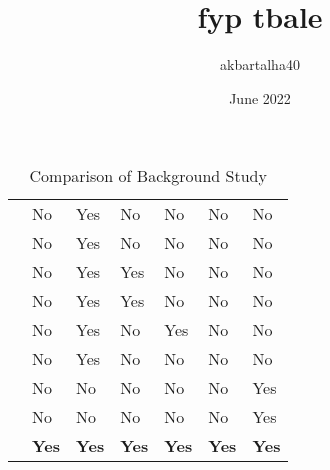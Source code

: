 \documentclass{article}
\title{fyp tbale}
\author{akbartalha40 }
\date{June 2022}
\begin{document}
\begin{table}[h]
 \caption{Comparison of Background Study}
    \label{tab:my_label}
    
\begin{tabular}{ | m{4.6cm} | m{1.2cm}| m{2cm} | m{2cm} | m{} | m{1cm} | m{1cm} | } 
  \hline
   &  &  &   &  &  &   \\ 
   \hline

    & No & Yes & No & No & No & No  \\ 
   \hline

  & No & Yes & No & No & No & No   \\ 
   \hline

  & No & Yes & Yes & No & No & No  \\ 
   \hline

  & No & Yes & Yes & No & No & No  \\ 
  \hline

& No & Yes & No & Yes & No & No  \\ 
  \hline
   
 & No & Yes & No & No & No & No  \\ 
   \hline
      
  & No & No & No & No & No & Yes  \\ 
   \hline
   
   & No & No & No & No & No & Yes  \\ 
   \hline
\textbf {  }
  & \textbf{Yes} &\textbf{ Yes} & \textbf{Yes} &\textbf{ Yes} &\textbf{ Yes}  & \textbf{Yes}\\ 
  \hline
\end{tabular}

\end{table}
\end{document}
